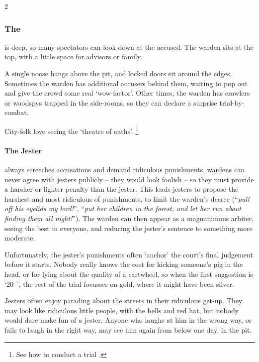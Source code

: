 \begin{multicols}{2}
\subsubsection{The }
\label{pitOfJustice}
is deep, so many spectators can look down at the accused.
The \gls{warden} sits at the top, with a little space for advisors or family.

A single noose hangs above the pit, and locked doors sit around the edges.
Sometimes the \gls{warden} has additional accusers behind them, waiting to pop out and give the crowd some real `wow-factor'.
Other times, the \gls{warden} has \glspl{crawler} or \glspl{woodspy} trapped in the side-rooms, so they can declare a surprise trial-by-combat.

City-folk love seeing the `theatre of oaths'.%
\footnote{See how to conduct a trial .}

\paragraph[the Jester]{The Jester}
\label{guildJester}%
always screeches accusations and demand ridiculous punishments.
\Glspl{warden} can never agree with jesters publicly -- they would look foolish -- so they must provide a harsher or lighter penalty than the jester.
This leads jesters to propose the harshest and most ridiculous of punishments, to limit the \gls{warden}'s decree (``\emph{pull off his eyelids my lord!}'', ``\emph{put her children in the forest, and let her run about finding them all night!}'').
The \gls{warden} can then appear as a magnanimous arbiter, seeing the best in everyone, and reducing the jester's sentence to something more moderate.

Unfortunately, the jester's punishments often `anchor' the court's final judgement before it starts.
Nobody really knows the cost for kicking someone's pig in the head, or for lying about the quality of a cartwheel, so when the first suggestion is `20~', the rest of the trial focusses on gold, where it might have been silver.

Jesters often enjoy parading about the streets in their ridiculous get-up.
They may look like ridiculous little people, with the bells and red hat, but nobody would dare make fun of a jester.
Anyone who laughs at him in the wrong way, or fails to laugh in the right way, may see him again from below one day, in the pit.


\end{multicols}
